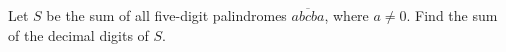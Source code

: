 Let $S$ be the sum of all five-digit palindromes $\overline{abcba}$, where $a\ne0$. Find the sum of the decimal digits of $S$.
